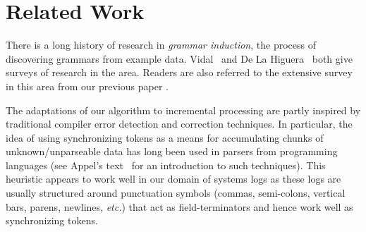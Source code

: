 \section{Related Work}
\label{sec:related}

There is a long history of research in {\em grammar induction},
the process of discovering grammars from example data.  
Vidal~\cite{vidal:gisurvey} and
De La Higuera~\cite{higuera01current} both give surveys
of research in the area. Readers are also referred to the extensive survey
in this area from our previous paper \cite{Fisher+:dirttoshovels}.
%

The adaptations of our algorithm to incremental processing 
are partly
inspired by traditional compiler error detection and correction
techniques.  In particular, the idea of using synchronizing tokens
as a means for accumulating chunks of unknown/unparseable data
has long been used in parsers from programming languages
(see Appel's text~\cite{appel:modern-compiler} for an
introduction to such techniques).  This heuristic appears to
work well in our domain of systems logs as these logs are
usually structured around punctuation symbols (commas, semi-colons,
vertical bars, parens, newlines, {\em etc.}) that act as
field-terminators and hence work well as synchronizing tokens.

